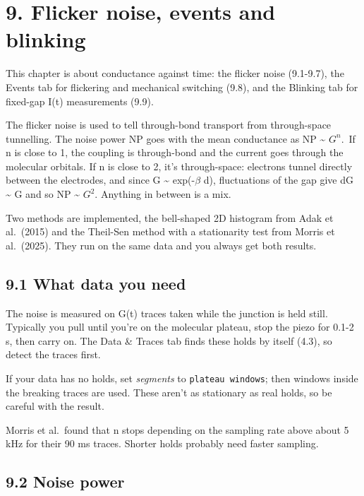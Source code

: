 \documentclass[
  11pt,
  a4paper,
]{article}
\begin{document}
\hypertarget{flicker-noise-events-and-blinking}{%
\section{9. Flicker noise, events and
blinking}\label{flicker-noise-events-and-blinking}}

This chapter is about conductance against time: the flicker noise
(9.1-9.7), the Events tab for flickering and mechanical switching (9.8),
and the Blinking tab for fixed-gap I(t) measurements (9.9).

The flicker noise is used to tell through-bond transport from
through-space tunnelling. The noise power NP goes with the mean
conductance as NP \textasciitilde{} $G^{n}$. If n is close to 1, the
coupling is through-bond and the current goes through the molecular
orbitals. If n is close to 2, it's through-space: electrons tunnel
directly between the electrodes, and since G \textasciitilde{}
exp(-$\beta$ d), fluctuations of the gap give dG \textasciitilde{} G and
so NP \textasciitilde{} $G^{2}$. Anything in between is a mix.

Two methods are implemented, the bell-shaped 2D histogram from Adak et
al.~(2015) and the Theil-Sen method with a stationarity test from Morris
et al.~(2025). They run on the same data and you always get both
results.

\hypertarget{what-data-you-need}{%
\subsection{9.1 What data you need}\label{what-data-you-need}}

The noise is measured on G(t) traces taken while the junction is held
still. Typically you pull until you're on the molecular plateau, stop
the piezo for 0.1-2 s, then carry on. The Data \& Traces tab finds these
holds by itself (4.3), so detect the traces first.

If your data has no holds, set \emph{segments} to
\texttt{plateau windows}; then windows inside the breaking traces are
used. These aren't as stationary as real holds, so be careful with the
result.

Morris et al.~found that n stops depending on the sampling rate above
about 5 kHz for their 90 ms traces. Shorter holds probably need faster
sampling.

\hypertarget{noise-power}{%
\subsection{9.2 Noise power}\label{noise-power}}
\end{document}
